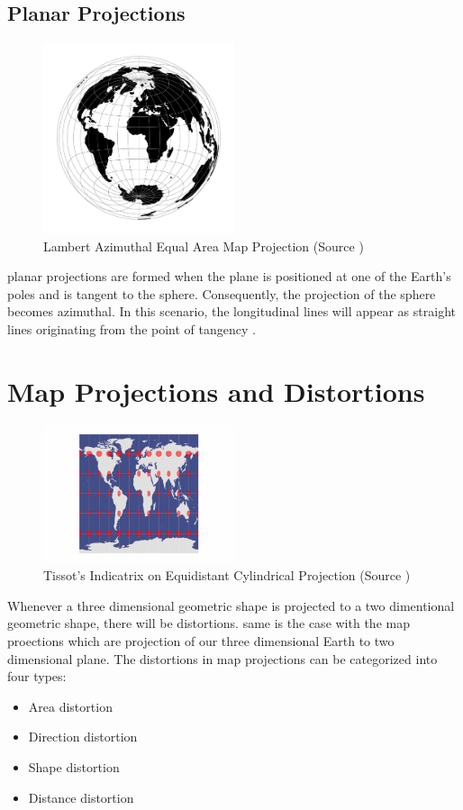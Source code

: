 \newpage
\subsection{Planar Projections}

\begin{figure}[h]
    \centering
    \includegraphics[width=0.5\textwidth]{figures/chapter-3/laea.png}
    \caption{Lambert Azimuthal Equal Area Map Projection (Source \cite{PROJ_SITE})}
    \label{fig:vitkovsky-image}
\end{figure}

planar projections are formed when the plane is positioned at one of the Earth's poles and is tangent to the sphere. Consequently, the projection of the sphere becomes azimuthal. In this scenario, the longitudinal lines will appear as straight lines originating from the point of tangency \cite{Snyder1982}.


\section{Map Projections and Distortions}
\begin{figure}[h]
    \centering
    \includegraphics[width=0.5\textwidth]{figures/chapter-3/Tissot-Equidistant-Cylindrical-1-678x486.png}
    \caption{Tissot's Indicatrix on Equidistant Cylindrical Projection (Source \cite{GISGEO_Tissot})}
    \label{fig:tissot-image}
\end{figure}
Whenever a three dimensional geometric shape is projected to a two dimentional geometric shape, there will be distortions. same is the case with the map proections which are projection of our three dimensional Earth to two dimensional plane.
The distortions in map projections can be categorized into four types:
\begin{itemize}
    \item Area distortion
    \item Direction distortion
    \item Shape distortion
    \item Distance distortion
\end{itemize}

